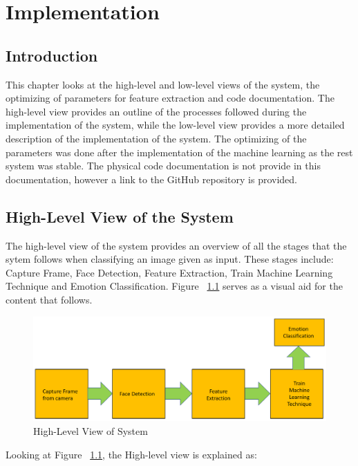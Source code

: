 \chapter{Implementation} %
%


\section{Introduction} %
This chapter looks at the high-level and low-level views of the system, the optimizing of parameters for feature extraction and code documentation. The high-level view provides an outline of the processes followed during the implementation of the system, while the low-level view provides a more detailed description of the implementation of the system. The optimizing of the parameters was done after the implementation of the machine learning as the rest system was stable. The physical code documentation is not provide in this documentation, however a link to the GitHub repository is provided.   
\section{High-Level View of the System}
The high-level view of the system provides an overview of all the stages that the sytem follows when classifying an image given as input. These stages include: Capture Frame, Face Detection, Feature Extraction, Train Machine Learning Technique and Emotion Classification. Figure ~\ref{fig: highlevel} serves as a visual aid for the content that follows.
\begin{figure}[H]
  \centering
  \includegraphics[scale=0.2]{pres1}
  \caption{High-Level View of System}
  \label{fig: highlevel}
\end{figure} 
Looking at Figure ~\ref{fig: highlevel}, the High-level view is explained as:

